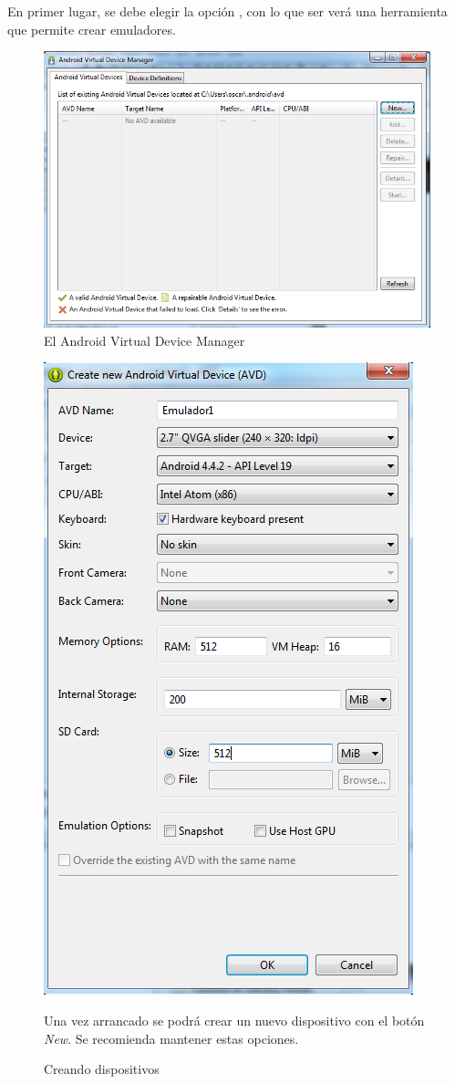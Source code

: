 \documentclass[a4paper,12pt,spanish]{sphinxmanual}
\begin{document}
En primer lugar, se debe elegir la opción , con lo que ser verá una herramienta que permite crear emuladores.
\begin{figure}[htbp]
\centering
\capstart

\includegraphics{avdmanager.png}
\caption{El Android Virtual Device Manager}\end{figure}
\begin{figure}[htbp]
\centering
\capstart

\includegraphics{creandoavd.png}
\caption{Creando dispositivos}{\small 
Una vez arrancado se podrá crear un nuevo dispositivo con el botón \emph{New}. Se recomienda mantener estas opciones.
}\end{figure}
\end{document}
